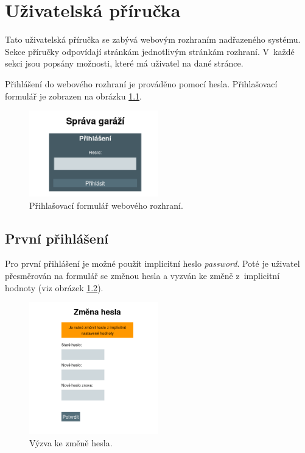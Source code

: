 \chapter{Uživatelská příručka}
\label{sec:guide}

Tato uživatelská příručka se zabývá webovým rozhraním nadřazeného systému. Sekce příručky odpovídají stránkám jednotlivým stránkám rozhraní. V~každé sekci jsou popsány možnosti, které má uživatel na dané stránce.

Přihlášení do webového rozhraní je prováděno pomocí hesla. Přihlašovací formulář je zobrazen na obrázku \ref{fig:login}.

\begin{figure}[h!]
    \centering
    \includegraphics[width=0.5\textwidth]{images/login.png}
    \caption[Přihlašovací formulář webového rozhraní]{Přihlašovací formulář webového rozhraní.}
    \label{fig:login}
\end{figure}

\section{První přihlášení}

Pro první přihlášení je možné použít implicitní heslo \textit{password}. Poté je uživatel přesměrován na formulář se změnou hesla a vyzván ke změně z~implicitní hodnoty (viz obrázek \ref{fig:password_change}).

\begin{figure}[h!]
    \centering
    \includegraphics[width=0.5\textwidth]{images/pwd_change.png}
    \caption[Výzva ke změně hesla]{Výzva ke změně hesla.}
    \label{fig:password_change}
\end{figure}

